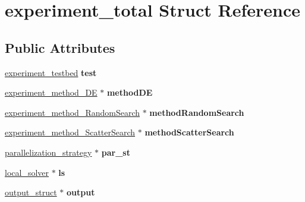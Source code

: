 \hypertarget{structexperiment__total}{\section{experiment\-\_\-total Struct Reference}
\label{structexperiment__total}
}
\subsection*{Public Attributes}
\begin{DoxyCompactItemize}
\item 
\hypertarget{structexperiment__total_aa7f84f134eedc1b69995360702aae064}{\hyperlink{structexperiment__testbed}{experiment\-\_\-testbed} {\bfseries test}}\label{structexperiment__total_aa7f84f134eedc1b69995360702aae064}

\item 
\hypertarget{structexperiment__total_a3548ca6774e003c49e35dd61147663ff}{\hyperlink{structexperiment__method__DE}{experiment\-\_\-method\-\_\-\-D\-E} $\ast$ {\bfseries method\-D\-E}}\label{structexperiment__total_a3548ca6774e003c49e35dd61147663ff}

\item 
\hypertarget{structexperiment__total_a7ba6300b68da3c6ac509df6c0827b37b}{\hyperlink{structexperiment__method__RandomSearch}{experiment\-\_\-method\-\_\-\-Random\-Search} $\ast$ {\bfseries method\-Random\-Search}}\label{structexperiment__total_a7ba6300b68da3c6ac509df6c0827b37b}

\item 
\hypertarget{structexperiment__total_a9e56a6adc4b6cbdd4a685e34750deb6d}{\hyperlink{structexperiment__method__ScatterSearch}{experiment\-\_\-method\-\_\-\-Scatter\-Search} $\ast$ {\bfseries method\-Scatter\-Search}}\label{structexperiment__total_a9e56a6adc4b6cbdd4a685e34750deb6d}

\item 
\hypertarget{structexperiment__total_ab6af87b681e1a044441e182fd6126dbe}{\hyperlink{structparallelization__strategy}{parallelization\-\_\-strategy} $\ast$ {\bfseries par\-\_\-st}}\label{structexperiment__total_ab6af87b681e1a044441e182fd6126dbe}

\item 
\hypertarget{structexperiment__total_a79b68987377b08d656c7072e5bee10af}{\hyperlink{structlocal__solver}{local\-\_\-solver} $\ast$ {\bfseries ls}}\label{structexperiment__total_a79b68987377b08d656c7072e5bee10af}

\item 
\hypertarget{structexperiment__total_a167167e099548c4053d8293aa2624f16}{\hyperlink{structoutput__struct}{output\-\_\-struct} $\ast$ {\bfseries output}}\label{structexperiment__total_a167167e099548c4053d8293aa2624f16}


\end{DoxyCompactItemize}
